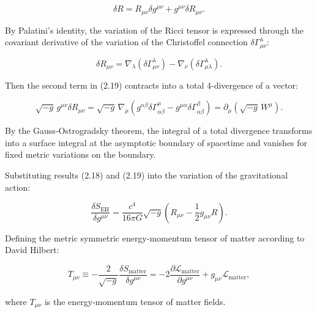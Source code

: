 \documentclass[11pt,a4paper]{article}
\theoremstyle{definition}
\begin{document}
\begin{equation}\label{eq:2.19}\tag{2.19}
\delta R = R_{\mu\nu} \delta g^{\mu\nu} + g^{\mu\nu} \delta R_{\mu\nu}.
\end{equation}

By Palatini's identity, the variation of the Ricci tensor is expressed through the covariant derivative of the variation of the Christoffel connection $\delta\Gamma^\lambda_{\mu\nu}$:

\begin{equation}\label{eq:2.20}\tag{2.20}
\delta R_{\mu\nu} = \nabla_\lambda (\delta\Gamma^\lambda_{\mu\nu}) - \nabla_\nu (\delta\Gamma^\lambda_{\mu\lambda}).
\end{equation}

Then the second term in (2.19) contracts into a total 4-divergence of a vector:

\begin{equation}\label{eq:2.21}\tag{2.21}
\sqrt{-g} \, g^{\mu\nu} \delta R_{\mu\nu} = \sqrt{-g} \, \nabla_\mu \left( g^{\alpha\beta} \delta\Gamma^\mu_{\alpha\beta} - g^{\mu\alpha} \delta\Gamma^\beta_{\alpha\beta} \right) = \partial_\mu \left( \sqrt{-g} \, W^\mu \right).
\end{equation}

By the Gauss-Ostrogradsky theorem, the integral of a total divergence transforms into a surface integral at the asymptotic boundary of spacetime and vanishes for fixed metric variations on the boundary.

Substituting results (2.18) and (2.19) into the variation of the gravitational action:

\begin{equation}\label{eq:2.22}\tag{2.22}
\frac{\delta S_{\text{EH}}}{\delta g^{\mu\nu}} = \frac{c^4}{16\pi G} \sqrt{-g} \left( R_{\mu\nu} - \frac{1}{2} g_{\mu\nu} R \right).
\end{equation}

Defining the metric symmetric energy-momentum tensor of matter according to David Hilbert:

\begin{equation}\label{eq:2.23}\tag{2.23}
T_{\mu\nu} \equiv -\frac{2}{\sqrt{-g}} \frac{\delta S_{\text{matter}}}{\delta g^{\mu\nu}} = -2 \frac{\partial \mathcal{L}_{\text{matter}}}{\partial g^{\mu\nu}} + g_{\mu\nu} \mathcal{L}_{\text{matter}},
\end{equation}

where $T_{\mu\nu}$ is the energy-momentum tensor of matter fields.
\end{document}
